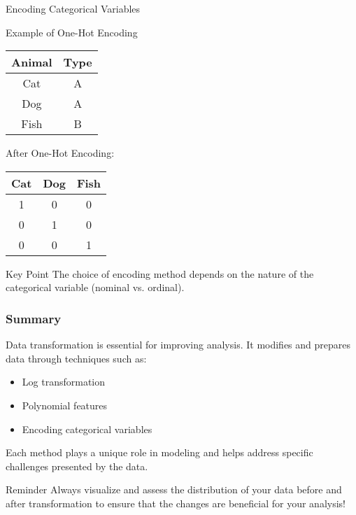 \documentclass{beamer}
\begin{document}
\begin{frame}[fragile]
\begin{block}{Encoding Categorical Variables}
        \begin{block}{Example of One-Hot Encoding}
            \begin{tabular}{|c|c|}
                \hline
                Animal & Type \\
                \hline
                Cat & A \\
                Dog & A \\
                Fish & B \\
                \hline
            \end{tabular}
            After One-Hot Encoding:
            \begin{tabular}{|c|c|c|}
                \hline
                Cat & Dog & Fish \\
                \hline
                1 & 0 & 0 \\
                0 & 1 & 0 \\
                0 & 0 & 1 \\
                \hline
            \end{tabular}
        \end{block}
        
        \begin{block}{Key Point}
            The choice of encoding method depends on the nature of the categorical variable (nominal vs. ordinal).
        \end{block}
    \end{block}
\end{frame}

\begin{frame}[fragile]
    \frametitle{Summary}
    
    Data transformation is essential for improving analysis. It modifies and prepares data through techniques such as:
    
    \begin{itemize}
        \item Log transformation
        \item Polynomial features
        \item Encoding categorical variables
    \end{itemize}
    
    Each method plays a unique role in modeling and helps address specific challenges presented by the data.
    
    \begin{block}{Reminder}
        Always visualize and assess the distribution of your data before and after transformation to ensure that the changes are beneficial for your analysis!
    \end{block}
\end{frame}
\end{document}
